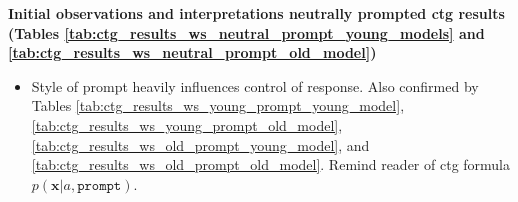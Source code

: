 \textbf{Initial observations and interpretations neutrally prompted ctg results (Tables \ref{tab:ctg_results_ws_neutral_prompt_young_models} and \ref{tab:ctg_results_ws_neutral_prompt_old_model})}
\begin{itemize}
    \item Style of prompt heavily influences control of response. Also confirmed by Tables \ref{tab:ctg_results_ws_young_prompt_young_model}, \ref{tab:ctg_results_ws_young_prompt_old_model}, \ref{tab:ctg_results_ws_old_prompt_young_model}, and \ref{tab:ctg_results_ws_old_prompt_old_model}. Remind reader of ctg formula $p(\textbf{x} | a, \texttt{prompt})$.

\end{itemize}
